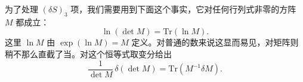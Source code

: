 为了处理 $(\delta S)_3$ 项，我们需要用到下面这个事实，它对任何行列式非零的方阵 $M$ 都成立：
\begin{equation*}
\ln(\det M) = \mathrm{Tr}(\ln M).
\tag{4.66}
\end{equation*}
这里 $\ln M$ 由 $\exp(\ln M)=M$ 定义。对普通的数来说这显而易见，对矩阵则稍不那么直截了当。对这个恒等式取变分给出
\begin{equation*}
\frac{1}{\det M}\,\delta(\det M) = \mathrm{Tr}(M^{-1}\delta M).
\tag{4.67}
\end{equation*}

